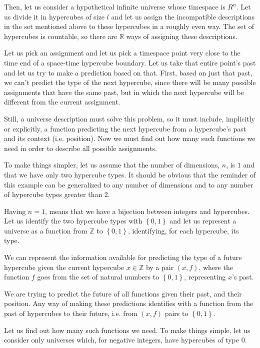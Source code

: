 \documentclass[a4paper
,draft
]{article}
\def\reale{\mathbb{R}}
\def\intregi{\mathbb{Z}}
\newcommand{\multime}[1]{\left\{ #1 \right\}}
\begin{document}
Then, let us consider a hypothetical infinite universe whose timespace is $R^n$.
Let us divide it in hypercubes of size $l$ and let us assign the incompatible
descriptions in the set mentioned above to these hypercubes in a roughly even
way.
The set of hypercubes is countable, so there are $\reale$ ways of
assigning these descriptions.

Let us pick an assignment and let us pick a timespace point very close to the
time end of a space-time hypercube boundary.
Let us take that entire point's past and let us try to make a prediction based
on that.
First, based on just that past, we can't predict the type of the next hypercube,
since there will be many possible assignments that have the same past, but in
which the next hypercube will be different from the current assignment.

Still, a universe description must solve this problem, so it must include,
implicitly or explicitly,
a function predicting the next hypercube from a hypercube's past
and its context (i.e. position). Now we must find out how many such functions
we need in order to describe all possible assignments.

To make things simpler, let us assume that the number of dimensions, $n$,
is $1$ and that we have only two hypercube types.
It should be obvious that
the reminder of this example can be generalized to any number of dimensions
and to any number of hypercube types greater than 2.

Having $n=1$, means that we have a bijection between integers and hypercubes.
Let us identify the two hypercube types with $\multime{0, 1}$ and
let us represent a universe as a function from $\intregi$ to $\multime{0, 1}$,
identifying, for each hypercube, its type.

We can represent the information available for predicting the type of a future
hypercube given the current hypercube $x\in\intregi$ by a pair $(x, f)$,
where the function
$f$ goes from the set of natural numbers to $\multime{0,1}$, representing
$x$'s past.

We are trying to predict the future of all functions given
their past, and their position.
Any way of making these predictions identifies with a function from the past
of hypercubes to their future, i.e. from $(x, f)$ pairs to $\multime{0, 1}$.

Let us find out how many such functions we need.
To make things simple, let us consider only universes which, for negative
integers, have hypercubes of type $0$.
\end{document}
